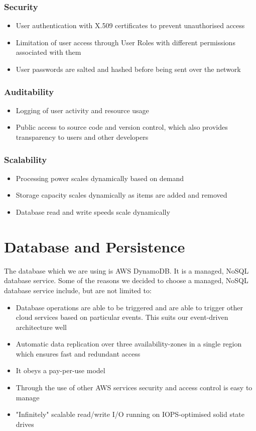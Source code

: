\documentclass{article}
\begin{document}
\subsubsection{Security}
\begin{itemize}
	\item User authentication with X.509 certificates to prevent unauthorised access
	\item Limitation of user access through User Roles with different permissions associated with them
	\item User passwords are salted and hashed before being sent over the network 
\end{itemize}

\subsubsection{Auditability}
\begin{itemize}
	\item Logging of user activity and resource usage
	\item Public access to source code and version control, which also provides transparency to users and other developers
\end{itemize}

\subsubsection{Scalability}
\begin{itemize}
	\item Processing power scales dynamically based on demand
	\item Storage capacity scales dynamically as items are added and removed
	\item Database read and write speeds scale dynamically
\end{itemize}

\section{Database and Persistence}
	The database which we are using is AWS DynamoDB. It is a managed, NoSQL database service. Some of the reasons we decided to choose a managed, NoSQL database service include, but are not limited to:
	\begin{itemize}
		\item Database operations are able to be triggered and are able to trigger other cloud services based on particular events. This suits our event-driven architecture well
		\item Automatic data replication over three availability-zones in a single region which ensures fast and redundant access
		\item It obeys a pay-per-use model
		\item Through the use of other AWS services security and access control is easy to manage
		\item "Infinitely" scalable read/write I/O running on IOPS-optimised solid state drives
	\end{itemize}
\end{document}
